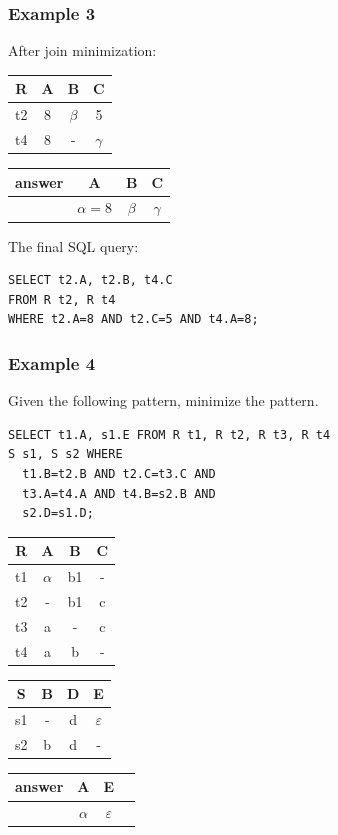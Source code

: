 \documentclass{beamer}
\begin{document}
\begin{frame}[fragile]
  \frametitle{Example 3}
  After join minimization:
  
  \begin{tabular}{ c | c c c}
  R & A & B & C \\
  \hline
  t2 & 8  & $\beta$  & 5 \\
  t4 & 8  & - & $\gamma$ \\
  \end{tabular}
  \begin{tabular}{ c | c c c}
  answer & A & B & C \\
  \hline
   & $\alpha=8$& $\beta$& $\gamma$\\
  \end{tabular}
 
  The final SQL query:
  \begin{verbatim}
SELECT t2.A, t2.B, t4.C
FROM R t2, R t4
WHERE t2.A=8 AND t2.C=5 AND t4.A=8;  
  \end{verbatim}
\end{frame}


\begin{frame}[fragile]
  \frametitle{Example 4}
  Given the following pattern, minimize the pattern. 
\begin{verbatim}
SELECT t1.A, s1.E FROM R t1, R t2, R t3, R t4
S s1, S s2 WHERE 
  t1.B=t2.B AND t2.C=t3.C AND
  t3.A=t4.A AND t4.B=s2.B AND
  s2.D=s1.D;
\end{verbatim}
  
  \begin{tabular}{ c | c c c}
  R & A & B & C \\
  \hline
  t1 & $\alpha$  & b1  & - \\
  t2 & -  & b1  & c \\
  t3 & a & - & c \\
  t4 & a  & b & - \\
  \end{tabular}
   \begin{tabular}{ c | c c c}
  S & B & D & E \\
  \hline
  s1 & -  & d  & $\varepsilon$ \\
  s2 & b  & d  & - \\
  \end{tabular}
  \begin{tabular}{ c | c c c}
  answer & A & E \\
  \hline
   & $\alpha$& $\varepsilon$\\
  \end{tabular}
\end{frame}
\end{document}
